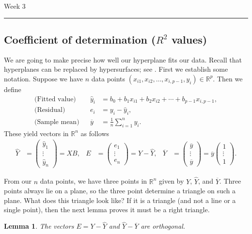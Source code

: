 \documentclass[a4paper, 12pt]{article}
\numberwithin{equation}{section}
\numberwithin{figure}{section}
\newtheorem{lem}[thm]{Lemma}
\theoremstyle{definition}
\newcommand{\R}{\mathbb{R}}
\newcommand{\WEEK}[1]{%
\hfill Week #1

\vspace{-1em}

\begin{center}
	\rule{\textwidth}{2pt}
\end{center}
\vspace{0.5em}%
}
\begin{document}
\WEEK{3}

\subsection{Coefficient of determination ($R^2$ values)}

We are going to make precise how well our hyperplane fits our data. Recall that
hyperplanes can be replaced by hypersurfaces; see .
First we establish some notation. Suppose we have $n$ data points $(x_{i1},
x_{i2}, \dots, x_{i,p-1}, y_i)\in \R^p$. Then we define  
\begin{align*}
	\text{(Fitted value)} & & \widehat{y}_i &= b_0 + b_1x_{i1} + b_2 x_{i2} + \cdots + b_{p-1} x_{i,p-1}, \\
	\text{(Residual)} & & e_i &= y_i - \widehat{y}_i, \\
	\text{(Sample mean)} & & \overline{y} &= \frac{1}{n}\sum_{i=1}^n y_i.
\end{align*}
These yield vectors in $\R^n$ as follows 
\begin{align*}
	\widehat{Y} &= \begin{pmatrix}
		\widehat{y}_1 \\ \vdots \\ \widehat{y}_n
	\end{pmatrix} = XB, & 
	E &= \begin{pmatrix}
		e_1 \\ \vdots \\ e_n
	\end{pmatrix} = Y - \widehat{Y}, & 
	\overline{Y} &= \begin{pmatrix}
		\overline{y} \\ \vdots \\ \overline{y}
	\end{pmatrix} = \overline{y} \begin{pmatrix}
		1 \\ \vdots \\ 1 
	\end{pmatrix}. 
\end{align*}

From our $n$ data points, we have three points in $\R^n$ given by $Y$,
$\widehat{Y}$, and $\overline{Y}$. Three points always lie on a plane, so the
three point determine a triangle on such a plane. What does this triangle look
like? If it is a triangle (and not a line or a single point), then the next
lemma proves it must be a right triangle.

\begin{lem}\label{lem:orthog}
	The vectors $E = Y - \widehat{Y}$ and $\widehat{Y}-\overline{Y}$ are
	orthogonal.
\end{lem}
\end{document}
